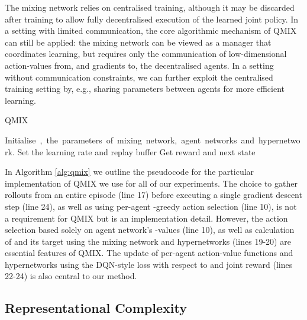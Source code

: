 \documentclass[twoside,11pt]{article}
\begin{document}
The mixing network relies on centralised training, 
although it may be discarded after training to allow fully decentralised 
execution of the learned joint policy.
In a setting with limited communication, the core algorithmic mechanism of QMIX 
can still be applied: the mixing network can be viewed as a manager that 
coordinates learning, but requires only the communication of low-dimensional 
action-values from, and gradients to, the decentralised agents.
In a setting without communication constraints, we can further exploit the 
centralised training setting by, e.g., sharing parameters between agents for more 
efficient learning. 


\begin{algorithm}[h!]
	\caption{QMIX}
	\label{alg:qmix}
	\begin{algorithmic}[1]
		\STATE \mbox{Initialise , the parameters of mixing network, agent networks and hypernetwork.}
		\STATE Set the learning rate  and replay buffer 
		\STATE   
		\WHILE{}
		\STATE{}
		\STATE 
		\STATE 
		\STATE {}
		\ENDFOR
		\STATE Get reward  and next state 
		\STATE 
		\STATE{}
		\ENDWHILE
		\IF {}
		\STATE {}
		\ENDFOR
		\STATE {}
		\STATE {}
		\ENDIF
		\STATE {} 
		\ENDIF
		\ENDWHILE
	\end{algorithmic}
\end{algorithm}

In Algorithm \ref{alg:qmix} we outline the pseudocode for the particular implementation of QMIX we use for all of our experiments. 
The choice to gather rollouts from an entire episode (line 17) before executing a single gradient descent step (line 24), as well as using per-agent -greedy action selection (line 10), is not a requirement for QMIX but is an implementation detail. However, the action selection based solely on agent network's -values (line 10), as well as calculation of  and its target using the mixing network and hypernetworks (lines 19-20) are essential features of QMIX. The update of per-agent action-value functions and hypernetworks using the DQN-style loss with respect to  and joint reward (lines 22-24) is also central to our method.
 
\subsection{Representational Complexity}
\end{document}

